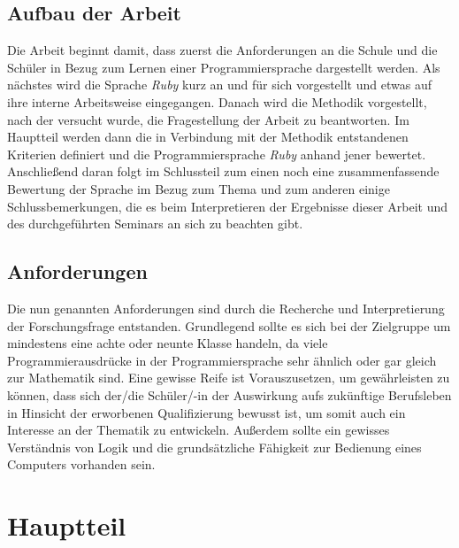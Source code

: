 \documentclass[12pt,DIV=14, version=first, BCOR=10mm,a4paper,twoside,parskip=half-,headsepline,headinclude]{scrartcl}
\begin{document}
\subsection{Aufbau der Arbeit}
\begin{flushleft}
Die Arbeit beginnt damit, dass zuerst die Anforderungen an die Schule und die Schüler in Bezug zum Lernen einer Programmiersprache dargestellt werden. Als nächstes wird die Sprache \textit{\glqq Ruby\grqq} kurz an und für sich vorgestellt und etwas auf ihre interne Arbeitsweise eingegangen. Danach wird die Methodik vorgestellt, nach der versucht wurde, die Fragestellung der Arbeit zu beantworten. Im Hauptteil werden dann die in Verbindung mit der Methodik entstandenen Kriterien definiert und die Programmiersprache \textit{\glqq Ruby\grqq} anhand jener bewertet. Anschließend daran folgt im Schlussteil zum einen noch eine zusammenfassende Bewertung der Sprache im Bezug zum Thema und zum anderen einige Schlussbemerkungen, die es beim Interpretieren der Ergebnisse dieser Arbeit und des durchgeführten Seminars an sich zu beachten gibt.
\end{flushleft}

\subsection{Anforderungen}
\begin{flushleft}
Die nun genannten Anforderungen sind durch die Recherche und Interpretierung  der Forschungsfrage entstanden. Grundlegend sollte es sich bei der Zielgruppe um mindestens eine achte oder neunte Klasse handeln, da viele Programmierausdrücke in der Programmiersprache sehr ähnlich oder gar gleich zur Mathematik sind. Eine gewisse Reife ist Vorauszusetzen, um gewährleisten zu können, dass sich der/die Schüler/-in der Auswirkung aufs zukünftige Berufsleben in Hinsicht der erworbenen Qualifizierung bewusst ist, um somit auch ein Interesse an der Thematik zu entwickeln. Außerdem sollte ein gewisses Verständnis von Logik und die grundsätzliche Fähigkeit zur Bedienung eines Computers vorhanden sein.
\end{flushleft}

\section{Hauptteil}
\end{document}
